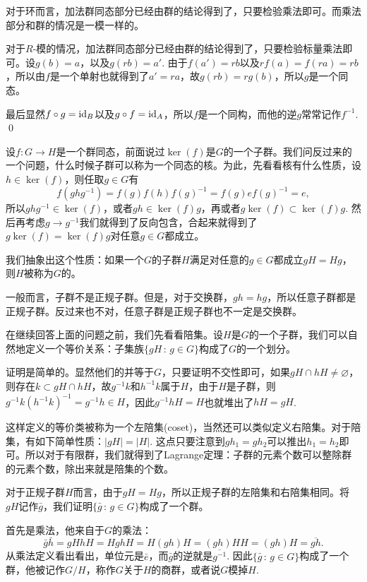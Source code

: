 对于环而言，加法群同态部分已经由群的结论得到了，只要检验乘法即可。而乘法部分和群的情况是一模一样的。

对于$R$-模的情况，加法群同态部分已经由群的结论得到了，只要检验标量乘法即可。设$g(b)=a$，以及$g(rb)=a'$. 由于$f(a')=rb$以及$rf(a)=f(ra)=rb$，所以由$f$是一个单射也就得到了$a'=ra$，故$g(rb)=rg(b)$，所以$g$是一个同态。

最后显然$f\circ g =\operatorname{id}_B$以及$g\circ f=\operatorname{id}_A$，所以$f$是一个同构，而他的逆$g$常常记作$f^{-1}$.
\qed

\para 设$f:G\to H$是一个群同态，前面说过$\ker(f)$是$G$的一个子群。我们问反过来的一个问题，什么时候子群可以称为一个同态的核。为此，先看看核有什么性质，设$h\in \ker(f)$，则任取$g\in G$有
\[
	f\left(ghg^{-1}\right)=f(g)f(h)f(g)^{-1}=f(g)ef(g)^{-1}=e,
\]
所以$ghg^{-1}\in \ker(f)$，或者$gh \in \ker(f)g$，再或者$g\ker(f)\subset \ker(f)g$. 然后再考虑$g\to g^{-1}$我们就得到了反向包含，合起来就得到了$g\ker(f)=\ker(f)g$对任意$g\in G$都成立。

我们抽象出这个性质：如果一个$G$的子群$H$满足对任意的$g\in G$都成立$gH=Hg$，则$H$被称为$G$的。

一般而言，子群不是正规子群。但是，对于交换群，$gh=hg$，所以任意子群都是正规子群。反过来也不对，任意子群是正规子群也不一定是交换群。

\para 在继续回答上面的问题之前，我们先看看陪集。设$H$是$G$的一个子群，我们可以自然地定义一个等价关系：子集族$\{gH\,:\, g\in G\}$构成了$G$的一个划分。

证明是简单的。显然他们的并等于$G$，只要证明不交性即可，如果$gH\cap hH\neq \varnothing$，则存在$k\subset gH\cap hH$，故$g^{-1}k$和$h^{-1}k$属于$H$，由于$H$是子群，则$g^{-1}k\left(h^{-1}k\right)^{-1}=g^{-1}h\in H$，因此$g^{-1}hH=H$也就堆出了$hH=gH$.

这样定义的等价类被称为一个左陪集(coset)，当然还可以类似定义右陪集。对于陪集，有如下简单性质：$|gH|=|H|$. 这点只要注意到$gh_1=gh_2$可以推出$h_1=h_2$即可。所以对于有限群，我们就得到了Lagrange定理：子群的元素个数可以整除群的元素个数，除出来就是陪集的个数。

\para 对于正规子群$H$而言，由于$gH=Hg$，所以正规子群的左陪集和右陪集相同。将$gH$记作$\bar{g}$，我们证明$\{\bar{g}\,:\, g\in G\}$构成了一个群。

首先是乘法，他来自于$G$的乘法：
\[
	\bar{g}\bar{h}=gHhH=HghH=H(gh)H=(gh)HH=(gh)H=\overline{gh}.
\]
从乘法定义看出看出，单位元是$\bar{e}$，而$\bar{g}$的逆就是$\overline{g^{-1}}$. 因此$\{\bar{g}\,:\, g\in G\}$构成了一个群，他被记作$G/H$，称作$G$关于$H$的商群，或者说$G$模掉$H$.

